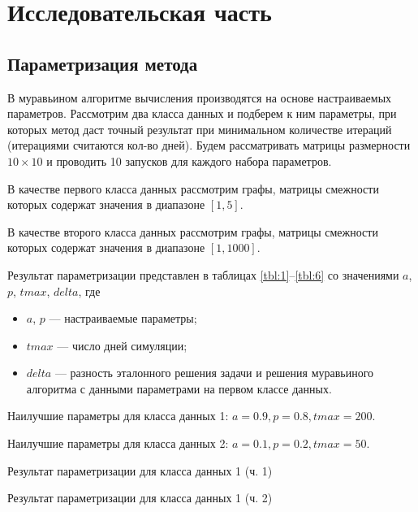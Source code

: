 \chapter{Исследовательская часть}

\section{Параметризация метода}
В муравьином алгоритме вычисления производятся на основе настраиваемых параметров.
Рассмотрим два класса данных и подберем к ним параметры, при которых метод даст точный результат при минимальном количестве итераций (итерациями считаются кол-во дней).
Будем рассматривать матрицы размерности $10\times10$ и проводить 10 запусков для каждого набора параметров.

В качестве первого класса данных рассмотрим графы, матрицы смежности которых содержат значения в диапазоне $[1, 5]$.

В качестве второго класса данных рассмотрим графы, матрицы смежности которых содержат значения в диапазоне $[1, 1000]$.

Результат параметризации представлен в таблицах \ref{tbl:1}--\ref{tbl:6} со значениями $a$, $p$, $tmax$, $delta$, где
\begin{itemize}
	\item $a$, $p$ --- настраиваемые параметры;
	\item $tmax$ --- число дней симуляции;
	\item $delta$ --- разность эталонного решения задачи и решения муравьиного алгоритма с данными параметрами на первом классе данных.
\end{itemize}

Наилучшие параметры для класса данных 1: $a = 0.9, p = 0.8, tmax = 200.$

Наилучшие параметры для класса данных 2: $a = 0.1, p = 0.2, tmax = 50.$

\begin{table}[h!]
	\caption{Результат параметризации для класса данных 1 (ч. 1)}
	\label{tbl:1}
	\begin{center}
	\end{center}
\end{table}
\newpage 

\begin{table}[h!]
	\caption{Результат параметризации для класса данных 1 (ч. 2)}
	\label{tbl:2}
	\begin{center}
	\end{center}
\end{table}
\newpage 

